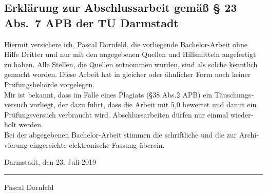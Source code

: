 \documentclass[longdoc,accentcolor=tud1b,11pt,paper=a4]{tudreport}
\title{\komTitle}
\subtitle{\komTitleTranslation \\ \komThesisType}
\newcommand{\komThesisType}{Bachelor-Arbeit\xspace}
\newcommand{\komName}{Pascal Dornfeld\xspace}
\newcommand{\komSubmissionDate}{23. Juli 2019\xspace}%
\begin{document}
	\frenchspacing
	\raggedbottom
	\maketitle


    \begin{otherlanguage}{ngerman}

    \chapter*{Erklärung zur Abschlussarbeit gemäß § 23 Abs.\ 7 APB der TU Darmstadt}
    Hiermit versichere ich, \komName, die vorliegende \komThesisType ohne Hilfe Dritter und nur mit den angegebenen Quellen und Hilfsmitteln angefertigt zu haben.
    Alle Stellen, die Quellen entnommen wurden, sind als solche kenntlich gemacht worden.
    Diese Arbeit hat in gleicher oder ähnlicher Form noch keiner Prüfungsbehörde vorgelegen.\\

    \noindent Mir ist bekannt, dass im Falle eines Plagiats (§38 Abs.2 APB) ein Täuschungsversuch vorliegt, der dazu führt, dass die Arbeit mit 5,0 bewertet und damit ein Prüfungsversuch verbraucht wird.
    Abschlussarbeiten dürfen nur einmal wiederholt werden.\\

    \noindent Bei der abgegebenen \komThesisType stimmen die schriftliche und die zur Archivierung eingereichte elektronische Fassung überein.

    \vspace{4em}

    \noindent Darmstadt, den \komSubmissionDate

    \vspace{3em}

    \noindent\rule{5cm}{0.4pt}

    \noindent\komName

    \end{otherlanguage}

	\tableofcontents

	\cleardoublepage
\end{document}
